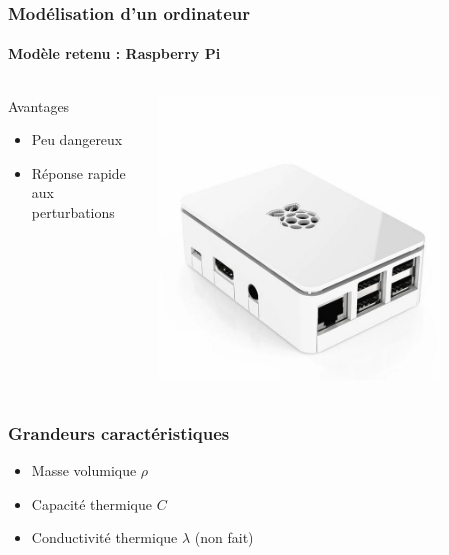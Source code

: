 \documentclass[a4paper,11pt]{beamer}
\begin{document}
\begin{frame}
    \frametitle{Modélisation d'un ordinateur}
    \framesubtitle{Modèle retenu : Raspberry Pi}

    \begin{columns}
        \begin{column}{0.5\textwidth}
            Avantages
            \begin{itemize}
                \item Peu dangereux
                \item Réponse rapide aux perturbations
            \end{itemize}
        \end{column}
        \begin{column}{0.5\textwidth}
            \includegraphics[width=0.8\textwidth]{raspberry_pi.jpg}
        \end{column}
    \end{columns}
\end{frame}

\begin{frame}
    \frametitle{Grandeurs caractéristiques}

    \begin{itemize}
        \item Masse volumique $\rho$
        \item Capacité thermique $C$
        \item Conductivité thermique $\lambda$ (non fait)
    \end{itemize}
\end{frame}
\end{document}
